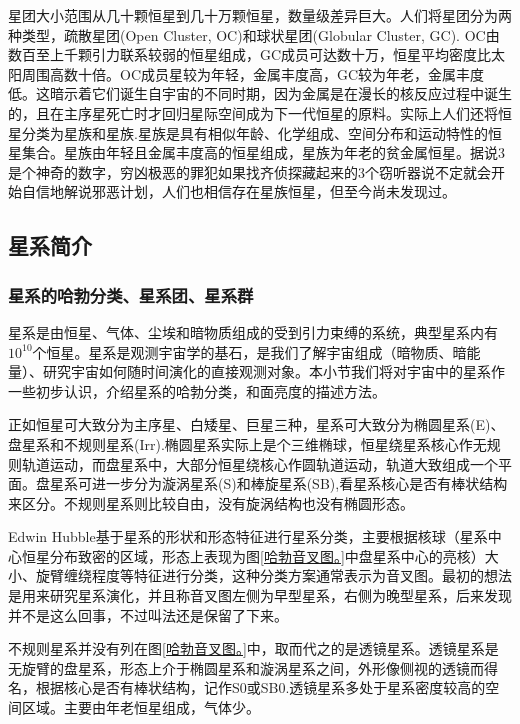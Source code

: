 \documentclass[../天体物理基础.tex]{subfiles}
\begin{document}
星团大小范围从几十颗恒星到几十万颗恒星，数量级差异巨大。人们将星团分为两种类型，疏散星团(Open Cluster, OC)和球状星团(Globular Cluster, GC). OC由数百至上千颗引力联系较弱的恒星组成，GC成员可达数十万，恒星平均密度比太阳周围高数十倍。OC成员星较为年轻，金属丰度高，GC较为年老，金属丰度低。这暗示着它们诞生自宇宙的不同时期，因为金属是在漫长的核反应过程中诞生的，且在主序星死亡时才回归星际空间成为下一代恒星的原料。实际上人们还将恒星分类为星族\uppercase\expandafter{}和星族\uppercase\expandafter{}.星族是具有相似年龄、化学组成、空间分布和运动特性的恒星集合。星族\uppercase\expandafter{}由年轻且金属丰度高的恒星组成，星族\uppercase\expandafter{}为年老的贫金属恒星。据说3是个神奇的数字，穷凶极恶的罪犯如果找齐侦探藏起来的3个窃听器说不定就会开始自信地解说邪恶计划，人们也相信存在星族\uppercase\expandafter{}恒星，但至今尚未发现过。

\subsection{星系简介}
\subsubsection{星系的哈勃分类、星系团、星系群}
星系是由恒星、气体、尘埃和暗物质组成的受到引力束缚的系统，典型星系内有$10^{10}$个恒星。星系是观测宇宙学的基石，是我们了解宇宙组成（暗物质、暗能量）、研究宇宙如何随时间演化的直接观测对象。本小节我们将对宇宙中的星系作一些初步认识，介绍星系的哈勃分类，和面亮度的描述方法。

正如恒星可大致分为主序星、白矮星、巨星三种，星系可大致分为椭圆星系(E)、盘星系和不规则星系(Irr).椭圆星系实际上是个三维椭球，恒星绕星系核心作无规则轨道运动，而盘星系中，大部分恒星绕核心作圆轨道运动，轨道大致组成一个平面。盘星系可进一步分为漩涡星系(S)和棒旋星系(SB),看星系核心是否有棒状结构来区分。不规则星系则比较自由，没有旋涡结构也没有椭圆形态。

Edwin Hubble基于星系的形状和形态特征进行星系分类，主要根据核球（星系中心恒星分布致密的区域，形态上表现为图\ref{哈勃音叉图。}中盘星系中心的亮核）大小、旋臂缠绕程度等特征进行分类，这种分类方案通常表示为音叉图。最初的想法是用来研究星系演化，并且称音叉图左侧为早型星系，右侧为晚型星系，后来发现并不是这么回事，不过叫法还是保留了下来。

不规则星系并没有列在图\ref{哈勃音叉图。}中，取而代之的是透镜星系。透镜星系是无旋臂的盘星系，形态上介于椭圆星系和漩涡星系之间，外形像侧视的透镜而得名，根据核心是否有棒状结构，记作S0或SB0.透镜星系多处于星系密度较高的空间区域。主要由年老恒星组成，气体少。
\end{document}
